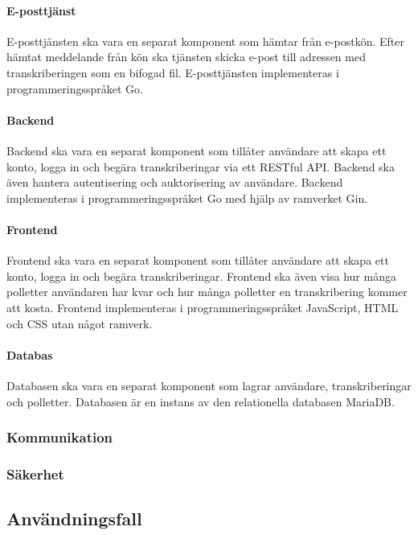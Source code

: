 \paragraph{E-posttjänst}
E-posttjänsten ska vara en separat komponent som hämtar från e-postkön. Efter
hämtat meddelande från kön ska tjänsten skicka e-post till adressen med
transkriberingen som en bifogad fil. E-posttjänsten implementeras i 
programmeringsspråket Go.

\paragraph{Backend}
Backend ska vara en separat komponent som tillåter användare att skapa ett
konto, logga in och begära transkriberingar via ett RESTful API. Backend ska
även hantera autentisering och auktorisering av användare. Backend implementeras
i programmeringsspråket Go med hjälp av ramverket Gin.

\paragraph{Frontend}
Frontend ska vara en separat komponent som tillåter användare att skapa ett
konto, logga in och begära transkriberingar. Frontend ska även visa hur
många polletter användaren har kvar och hur många polletter en transkribering
kommer att kosta. Frontend implementeras i programmeringsspråket JavaScript,
HTML och CSS utan något ramverk.

\paragraph{Databas}
Databasen ska vara en separat komponent som lagrar användare, transkriberingar
och polletter. Databasen är en instans av den relationella databasen MariaDB.

\subsubsection{Kommunikation}

\subsubsection{Säkerhet}

\subsection{Användningsfall}

